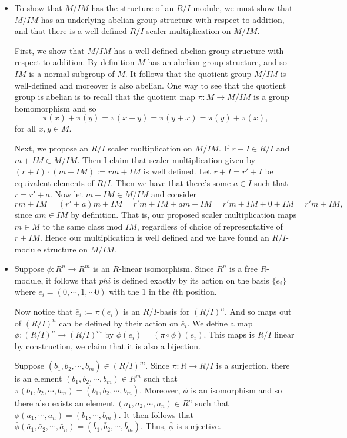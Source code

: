 \documentclass[12pt,letterpaper,boxed]{hmcpset}
\begin{document}
\begin{solution}
\begin{itemize}
\item To show that $M/IM$ has the structure of an $R/I$-module, we
must show that $M/IM$ has an underlying abelian group structure with
respect to addition, and that there is a well-defined $R/I$ scaler
multiplication on $M/IM$.

First, we show that $M/IM$ has a well-defined abelian group structure
with respect to addition. By definition $M$ has an abelian group
structure, and so $IM$ is a normal subgroup of $M$. It follows that
the quotient group $M/IM$ is well-defined and moreover is also
abelian. One way to see that the quotient group is abelian is to
recall that the quotient map $\pi: M \to M/IM$ is a group homomorphism
and so \[
\pi(x) + \pi(y) = \pi(x + y) = \pi(y + x) = \pi(y) + \pi(x),
\]
for all $x,y \in M$. 

Next, we propose an $R/I$ scaler multiplication on $M/IM$. If $r + I
\in R/I$ and $m + IM \in M/IM$. Then I claim that scaler multiplication given
by $(r+I) \cdot (m + IM) := rm + IM$ is well defined.
Let $r + I = r' + I$ be equivalent elements of $R/I$. Then we have
that there's some $a \in I$ such that $r = r' + a$. Now let $m + IM
\in M/IM$ and consider \[
rm + IM = (r' + a)m + IM = r'm + IM + am + IM = r'm + IM + 0 + IM =
r'm + IM,
\]
since $am \in IM$ by definition. That is, our proposed scaler
multiplication maps $m \in M$ to the same class mod $IM$, regardless
of choice of representative of $r + IM$. Hence our multiplication is
well defined and we have found an $R/I$-module structure on $M/IM$.

\item 
Suppose $\phi: R^n \to R^m$ is an $R$-linear isomorphism. Since $R^n$
is a free $R$-module, it follows that $phi$ is defined exactly by its
action on the basis $\{e_i\}$ where $e_i = (0, \cdots, 1, \cdots 0)$
with the $1$ in the $i$th position.

Now notice that $\bar e_i := \pi(e_i)$ is an $R/I$-basis for
$(R/I)^n$. And so maps out of $(R/I)^n$ can be defined by their action
on $\bar e_i$. We define a map $\bar \phi: (R/I)^n \to (R/I)^m$ by
$\bar \phi(\bar e_i) = (\pi \circ \phi)(e_i)$. This maps is $R/I$
linear by construction, we claim that it is also a bijection.

Suppose $(\bar b_1, \bar b_2, \cdots, \bar b_m) \in (R/I)^m$. Since
$\pi: R \to R/I$ is a surjection, there is an element $(b_1, b_2,
\cdots, b_m) \in R^m$ such that $\pi(b_1, b_2, \cdots, b_m) = (\bar
b_1, \bar b_2, \cdots, \bar b_m)$. Moreover, $\phi$ is an isomorphism
and so there also exists an element $(a_1, a_2, \cdots, a_n) \in R^n$
such that $\phi(a_1, \cdots, a_n) = (b_1, \cdots, b_m)$. It then
follows that $\bar\phi(\bar a_1, \bar a_2, \cdots, \bar a_n) = (\bar
b_1, \bar b_2, \cdots, \bar b_m)$. Thus, $\bar \phi$ is surjective.


\end{itemize}
\end{solution}
\end{document}
